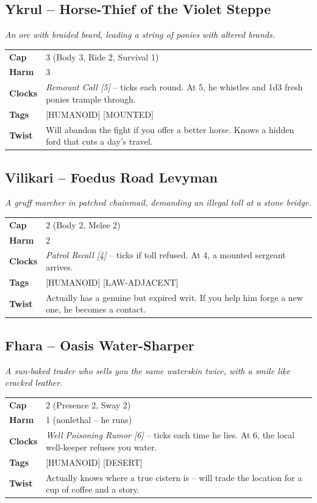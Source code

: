 \documentclass[10pt,twocolumn]{article}
\newcommand{\kw}[1]{\textbf{#1}}     %
\begin{document}
\subsection*{Ykrul -- Horse-Thief of the Violet Steppe}
\textit{An orc with braided beard, leading a string of ponies with altered brands.}
\begin{tabular}{@{}ll}
\toprule
\kw{Cap} & 3 (Body 3, Ride 2, Survival 1) \\
\kw{Harm} & 3 \\
\kw{Clocks} & \textit{Remount Call [5]} -- ticks each round. At 5, he whistles and 1d3 fresh ponies trample through. \\
\kw{Tags} & [HUMANOID] [MOUNTED] \\
\kw{Twist} & Will abandon the fight if you offer a better horse. Knows a hidden ford that cuts a day's travel. \\
\bottomrule
\end{tabular}

\subsection*{Vilikari -- Foedus Road Levyman}
\textit{A gruff marcher in patched chainmail, demanding an illegal toll at a stone bridge.}
\begin{tabular}{@{}ll}
\toprule
\kw{Cap} & 2 (Body 2, Melee 2) \\
\kw{Harm} & 2 \\
\kw{Clocks} & \textit{Patrol Recall [4]} -- ticks if toll refused. At 4, a mounted sergeant arrives. \\
\kw{Tags} & [HUMANOID] [LAW-ADJACENT] \\
\kw{Twist} & Actually has a genuine but expired writ. If you help him forge a new one, he becomes a contact. \\
\bottomrule
\end{tabular}

\subsection*{Fhara -- Oasis Water-Sharper}
\textit{A sun-baked trader who sells you the same waterskin twice, with a smile like cracked leather.}
\begin{tabular}{@{}ll}
\toprule
\kw{Cap} & 2 (Presence 2, Sway 2) \\
\kw{Harm} & 1 (nonlethal -- he runs) \\
\kw{Clocks} & \textit{Well Poisoning Rumor [6]} -- ticks each time he lies. At 6, the local well-keeper refuses you water. \\
\kw{Tags} & [HUMANOID] [DESERT] \\
\kw{Twist} & Actually knows where a true cistern is -- will trade the location for a cup of coffee and a story. \\
\bottomrule
\end{tabular}
\end{document}
